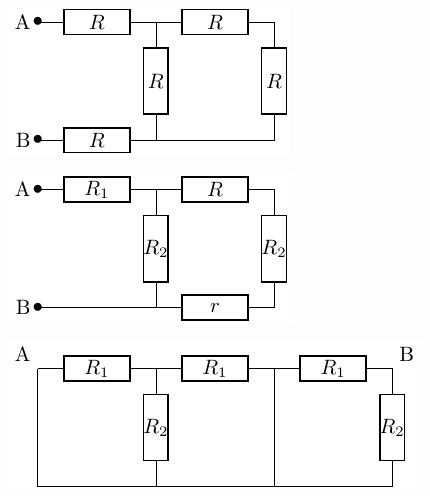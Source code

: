 \documentclass[../../main/main.tex]{subfiles}
\begin{document}
\begin{minipage}{0.32\linewidth}
	\begin{center}
		\includegraphics[width=\linewidth]{requiv_a-plain}
	\end{center}
\end{minipage}
\begin{minipage}{0.32\linewidth}
	\begin{center}
		\includegraphics[width=\linewidth]{requiv_b-plain}
	\end{center}
\end{minipage}
\begin{minipage}{0.32\linewidth}
	\begin{center}
		\includegraphics[width=\linewidth]{requiv_c-plain}
	\end{center}
\end{minipage}
\end{document}
